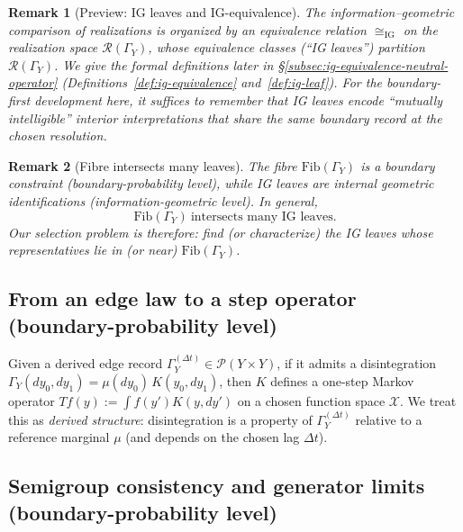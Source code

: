\documentclass[11pt]{article}
\newtheorem{remark}{Remark}
\newcommand{\Rcal}{\mathcal{R}}
\newcommand{\Pcal}{\mathcal{P}}
\newcommand{\Xcal}{\mathcal{X}}
\newcommand{\Fib}{\mathrm{Fib}} %
\begin{document}
\begin{remark}[Preview: IG leaves and IG-equivalence]\label{rem:ig-leaves-preview}
The information--geometric comparison of realizations is organized by an
equivalence relation $\cong_{\mathrm{IG}}$ on the realization space
$\Rcal(\Gamma_Y)$, whose equivalence classes (``IG leaves'')
partition $\Rcal(\Gamma_Y)$.
We give the formal definitions later in
\S\ref{subsec:ig-equivalence-neutral-operator}
(Definitions~\ref{def:ig-equivalence} and~\ref{def:ig-leaf}).
For the boundary-first development here, it suffices to remember that
IG leaves encode ``mutually intelligible'' interior interpretations that
share the same boundary record at the chosen resolution.
\end{remark}



\begin{remark}[Fibre intersects many leaves]
The fibre $\Fib(\Gamma_Y)$ is a \emph{boundary constraint} (boundary-probability level), while IG leaves are \emph{internal geometric identifications} (information-geometric level).
In general,
\[
\Fib(\Gamma_Y)\ \text{intersects many IG leaves.}
\]
Our selection problem is therefore: find (or characterize) the IG leaves whose representatives lie in (or near) $\Fib(\Gamma_Y)$.
\end{remark}



\subsection{From an edge law to a step operator (boundary-probability level)}

Given a derived edge record $\Gamma_Y^{(\Delta t)}\in\Pcal(Y\times Y)$, if it admits a disintegration
$\Gamma_Y(dy_0,dy_1)=\mu(dy_0)\,K(y_0,dy_1)$, then $K$ defines a one-step Markov operator
$T f(y):=\int f(y')K(y,dy')$ on a chosen function space $\Xcal$.
We treat this as \emph{derived structure}: disintegration is a property of $\Gamma_Y^{(\Delta t)}$ relative to a reference marginal $\mu$ (and depends on the chosen lag $\Delta t$).

\subsection{Semigroup consistency and generator limits (boundary-probability level)}
\end{document}
